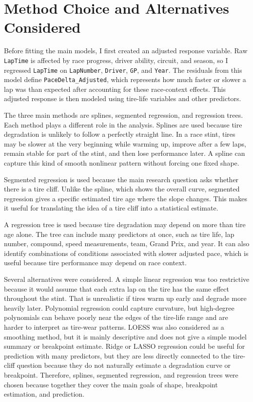 \documentclass[11pt]{article}
\begin{document}
\section{Method Choice and Alternatives Considered}

Before fitting the main models, I first created an adjusted response variable. Raw \texttt{LapTime} is affected by race progress, driver ability, circuit, and season, 
so I regressed \texttt{LapTime} on \texttt{LapNumber}, \texttt{Driver}, \texttt{GP}, and \texttt{Year}. The residuals from this model define \texttt{PaceDelta\_Adjusted}, 
which represents how much faster or slower a lap was than expected after accounting for these race-context effects. This adjusted response is then modeled using tire-life variables and other predictors.

The three main methods are splines, segmented regression, and regression trees. Each method plays a different role in the analysis. Splines are used because tire 
degradation is unlikely to follow a perfectly straight line. In a race stint, tires may be slower at the very beginning while warming up, improve after a few laps, 
remain stable for part of the stint, and then lose performance later. A spline can capture this kind of smooth nonlinear pattern without forcing one fixed shape.

Segmented regression is used because the main research question asks whether there is a tire cliff. Unlike the spline, which shows the overall curve, segmented regression 
gives a specific estimated tire age where the slope changes. This makes it useful for translating the idea of a tire cliff into a statistical estimate.

A regression tree is used because tire degradation may depend on more than tire age alone. The tree can include many predictors at once, such as tire life, lap number, 
compound, speed measurements, team, Grand Prix, and year. It can also identify combinations of conditions associated with slower adjusted pace, which is useful because 
tire performance may depend on race context.

Several alternatives were considered. A simple linear regression was too restrictive because it would assume that each extra lap on the tire has the same effect throughout 
the stint. That is unrealistic if tires warm up early and degrade more heavily later. Polynomial regression could capture curvature, but high-degree polynomials can behave 
poorly near the edges of the tire-life range and are harder to interpret as tire-wear patterns. LOESS was also considered as a smoothing method, but it is mainly descriptive 
and does not give a simple model summary or breakpoint estimate. Ridge or LASSO regression could be useful for prediction with many predictors, but they are less directly 
connected to the tire-cliff question because they do not naturally estimate a degradation curve or breakpoint. Therefore, splines, segmented regression, and regression trees 
were chosen because together they cover the main goals of shape, breakpoint estimation, and prediction.
\end{document}

